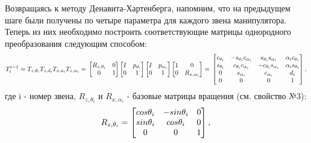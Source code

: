 \hspace*{\parindent} Возвращаясь к методу Денавита-Хартенберга, напомним, что на предыдущем шаге были получены по четыре параметра для каждого звена манипулятора. Теперь из них необходимо построить соответствующие матрицы однородного преобразования следующим способом:\\
%
\begin{equation*}\label{eq:model}
T_i^{i-1} = T_{z,{\theta_i}} T_{z,{d_i}} T_{x,{a_i}} T_{z,{\alpha_i}} = \\
     \begin{bmatrix}
      R_{z,{\theta_i}} & 0\\
      0 & 1 \\
    \end{bmatrix}
    \begin{bmatrix}
      I & p_{d_i}\\
      0 & 1 \\
    \end{bmatrix}
    \begin{bmatrix}
      I & p_{\alpha_i}\\
      0 & 1 \\
    \end{bmatrix}
    \begin{bmatrix}
      1 & 0\\
      0 & R_{x,{\alpha_i}} \\
    \end{bmatrix}
    = \\
     \begin{bmatrix}
      c_{\theta_i} & -s_{\theta_i}c_{\alpha_i} & s_{\theta_i}s_{\alpha_i} & \alpha_i c_{\theta_i} \\
      s_{\theta_i} & c_{\theta_i}c_{\alpha_i} & -c_{\theta_i}s_{\alpha_i} & \alpha_i s_{\theta_i} \\
      0 & s_{\alpha_i} & c_{\alpha_i} & d_i\\
      0 & 0 & 0 & 1\\
    \end{bmatrix}
    ,\\
\end{equation*} 
\hspace*{\parindent}где i - номер звена,  $R_{z,{\theta_i}}$ и $R_{x,{\alpha_i}}$  - базовые матрицы вращения (см. свойство №3):
\begin{equation*}\label{eq:model}
R_{z, \theta_i} = 
     \begin{bmatrix}
    cos\theta_i & -sin\theta_i & 0\\
    sin\theta_i & cos\theta_i & 0\\
    0 & 0 & 1\\
    \end{bmatrix}
    , \\
\end{equation*} 

